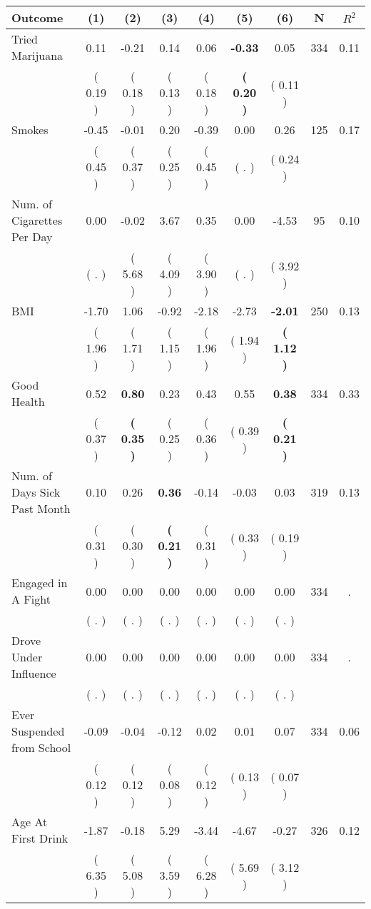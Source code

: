 \begin{tabular}{lcccccccc}
\toprule
 \textbf{Outcome} & \textbf{(1)} & \textbf{(2)} & \textbf{(3)} & \textbf{(4)} & \textbf{(5)} & \textbf{(6)} & \textbf{N} & \textbf{$ R^2$} \\
\midrule
Tried Marijuana &      0.11 &     -0.21 &      0.14 &      0.06 & \textbf{    -0.33} &      0.05 & 334 &       0.11 \\ 
 & (     0.19 ) & (     0.18 ) & (     0.13 ) & (     0.18 ) & \textbf{(     0.20 )} & (     0.11 ) & \\
Smokes &     -0.45 &     -0.01 &      0.20 &     -0.39 &      0.00 &      0.26 & 125 &       0.17 \\ 
 & (     0.45 ) & (     0.37 ) & (     0.25 ) & (     0.45 ) & (        . ) & (     0.24 ) & \\
Num. of Cigarettes Per Day &      0.00 &     -0.02 &      3.67 &      0.35 &      0.00 &     -4.53 & 95 &       0.10 \\ 
 & (        . ) & (     5.68 ) & (     4.09 ) & (     3.90 ) & (        . ) & (     3.92 ) & \\
BMI &     -1.70 &      1.06 &     -0.92 &     -2.18 &     -2.73 & \textbf{    -2.01} & 250 &       0.13 \\ 
 & (     1.96 ) & (     1.71 ) & (     1.15 ) & (     1.96 ) & (     1.94 ) & \textbf{(     1.12 )} & \\
Good Health &      0.52 & \textbf{     0.80} &      0.23 &      0.43 &      0.55 & \textbf{     0.38} & 334 &       0.33 \\ 
 & (     0.37 ) & \textbf{(     0.35 )} & (     0.25 ) & (     0.36 ) & (     0.39 ) & \textbf{(     0.21 )} & \\
Num. of Days Sick Past Month &      0.10 &      0.26 & \textbf{     0.36} &     -0.14 &     -0.03 &      0.03 & 319 &       0.13 \\ 
 & (     0.31 ) & (     0.30 ) & \textbf{(     0.21 )} & (     0.31 ) & (     0.33 ) & (     0.19 ) & \\
Engaged in A Fight &      0.00 &      0.00 &      0.00 &      0.00 &      0.00 &      0.00 & 334 &          . \\ 
 & (        . ) & (        . ) & (        . ) & (        . ) & (        . ) & (        . ) & \\
Drove Under Influence &      0.00 &      0.00 &      0.00 &      0.00 &      0.00 &      0.00 & 334 &          . \\ 
 & (        . ) & (        . ) & (        . ) & (        . ) & (        . ) & (        . ) & \\
Ever Suspended from School &     -0.09 &     -0.04 &     -0.12 &      0.02 &      0.01 &      0.07 & 334 &       0.06 \\ 
 & (     0.12 ) & (     0.12 ) & (     0.08 ) & (     0.12 ) & (     0.13 ) & (     0.07 ) & \\
Age At First Drink &     -1.87 &     -0.18 &      5.29 &     -3.44 &     -4.67 &     -0.27 & 326 &       0.12 \\ 
 & (     6.35 ) & (     5.08 ) & (     3.59 ) & (     6.28 ) & (     5.69 ) & (     3.12 ) & \\
\bottomrule
\end{tabular}
